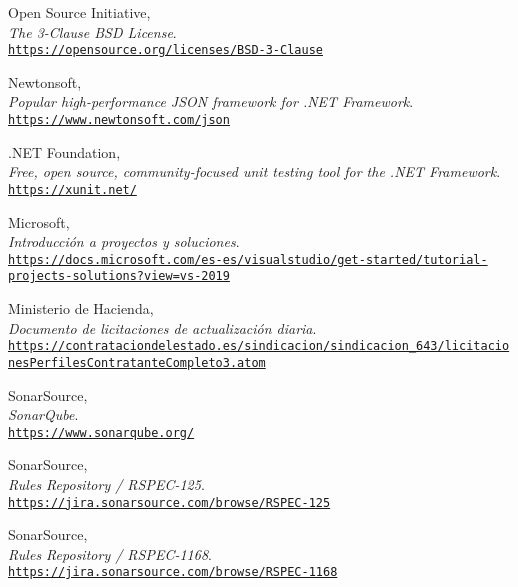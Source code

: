 \begin{thebibliography}{X}
            Open Source Initiative,
            \\ \textit{The 3-Clause BSD License}.
            \\ \texttt{\url{https://opensource.org/licenses/BSD-3-Clause}}
        
            Newtonsoft,
            \\ \textit{Popular high-performance JSON framework for .NET Framework}.
            \\ \texttt{\url{https://www.newtonsoft.com/json}}
        
            .NET Foundation,
            \\ \textit{Free, open source, community-focused unit testing tool for the .NET Framework}.
            \\ \texttt{\url{https://xunit.net/}}
        
            Microsoft,
            \\ \textit{Introducción a proyectos y soluciones}.
            \\ \texttt{\url{https://docs.microsoft.com/es-es/visualstudio/get-started/tutorial-projects-solutions?view=vs-2019}}
        
            Ministerio de Hacienda,
            \\ \textit{Documento de licitaciones de actualización diaria}.
            \\ \texttt{\url{https://contrataciondelestado.es/sindicacion/sindicacion\_643/licitacionesPerfilesContratanteCompleto3.atom}}
            
            SonarSource,
            \\ \textit{SonarQube}.
            \\ \texttt{\url{https://www.sonarqube.org/}}
            
            SonarSource,
            \\ \textit{Rules Repository / RSPEC-125}.
            \\ \texttt{\url{https://jira.sonarsource.com/browse/RSPEC-125}}
            
            SonarSource,
            \\ \textit{Rules Repository / RSPEC-1168}.
            \\ \texttt{\url{https://jira.sonarsource.com/browse/RSPEC-1168}}
            

\end{thebibliography}
